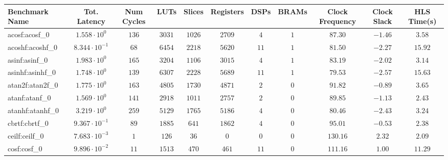 \begin{tabular}{|l|c|c|c|c|c|c|c|c|c|c|}
\hline
Benchmark Name               & Tot. Latency            & Num Cycles & LUTs       & Slices    & Registers & DSPs    & BRAMs & Clock Frequency & Clock Slack & HLS Time(s) \\
\hline
acosf:acosf\_0               & $ 1.558 \cdot 10^{0}  $ & $ 136    $ & $ 3031   $ & $ 1026  $ & $ 2709  $ & $ 4   $ & $ 1 $ & $ 87.30       $ & $ -1.46   $ & $ 3.58    $ \\
acoshf:acoshf\_0             & $ 8.344 \cdot 10^{-1} $ & $ 68     $ & $ 6454   $ & $ 2218  $ & $ 5620  $ & $ 11  $ & $ 1 $ & $ 81.50       $ & $ -2.27   $ & $ 15.92   $ \\
asinf:asinf\_0               & $ 1.983 \cdot 10^{0}  $ & $ 165    $ & $ 3204   $ & $ 1106  $ & $ 3015  $ & $ 4   $ & $ 1 $ & $ 83.19       $ & $ -2.02   $ & $ 3.14    $ \\
asinhf:asinhf\_0             & $ 1.748 \cdot 10^{0}  $ & $ 139    $ & $ 6307   $ & $ 2228  $ & $ 5689  $ & $ 11  $ & $ 1 $ & $ 79.53       $ & $ -2.57   $ & $ 15.63   $ \\
atan2f:atan2f\_0             & $ 1.775 \cdot 10^{0}  $ & $ 163    $ & $ 4805   $ & $ 1730  $ & $ 4871  $ & $ 2   $ & $ 0 $ & $ 91.82       $ & $ -0.89   $ & $ 3.65    $ \\
atanf:atanf\_0               & $ 1.569 \cdot 10^{0}  $ & $ 141    $ & $ 2918   $ & $ 1011  $ & $ 2757  $ & $ 2   $ & $ 0 $ & $ 89.85       $ & $ -1.13   $ & $ 2.43    $ \\
atanhf:atanhf\_0             & $ 3.219 \cdot 10^{0}  $ & $ 259    $ & $ 5129   $ & $ 1765  $ & $ 5186  $ & $ 4   $ & $ 0 $ & $ 80.46       $ & $ -2.43   $ & $ 3.24    $ \\
cbrtf:cbrtf\_0               & $ 9.367 \cdot 10^{-1} $ & $ 89     $ & $ 1885   $ & $ 641   $ & $ 1862  $ & $ 4   $ & $ 0 $ & $ 95.01       $ & $ -0.53   $ & $ 2.38    $ \\
ceilf:ceilf\_0               & $ 7.683 \cdot 10^{-3} $ & $ 1      $ & $ 126    $ & $ 36    $ & $ 0     $ & $ 0   $ & $ 0 $ & $ 130.16      $ & $ 2.32    $ & $ 2.09    $ \\
cosf:cosf\_0                 & $ 9.896 \cdot 10^{-2} $ & $ 11     $ & $ 1513   $ & $ 470   $ & $ 461   $ & $ 11  $ & $ 0 $ & $ 111.16      $ & $ 1.00    $ & $ 11.29   $ \\

\end{tabular}
